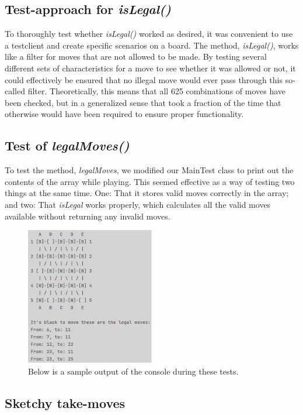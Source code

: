 \documentclass[12pt, a4paper]{article}
\begin{document}
\subsection{Test-approach for \emph{isLegal()}}
To thoroughly test whether \emph{isLegal()} worked as desired, it was convenient to use a testclient and create specific scenarios on a board. The method, \emph{isLegal()}, works like a filter for moves that are not allowed to be made. By testing several different sets of characteristics for a move to see whether it was allowed or not, it could effectively be ensured that no illegal move would ever pass through this so-called filter. Theoretically, this means that all 625 combinations of moves have been checked, but in a generalized sense that took a fraction of the time that otherwise would have been required to ensure proper functionality.

\subsection{Test of \emph{legalMoves()}}
To test the method, \emph{legalMoves}, we modified our MainTest class to print out the contents of the array while playing. This seemed effective as a way of testing two things at the same time. One: That it stores valid moves correctly in the array; and two: That \emph{isLegal} works properly, which calculates all the valid moves available without returning any invalid moves. \par

\begin{figure}[h]
	\caption*{Below is a sample output of the console during these tests.}
	\centering
	\includegraphics[width=0.5\textwidth]{isLegalprint.png}		
\end{figure}

\subsection{Sketchy take-moves}
\end{document}
